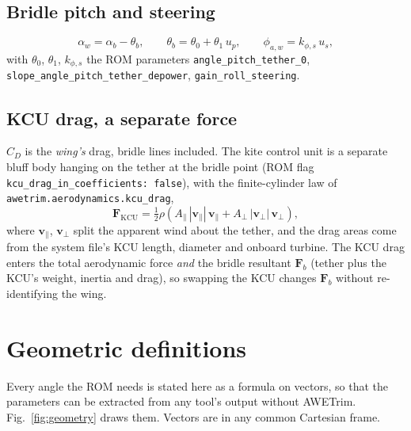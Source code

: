 \documentclass[11pt,a4paper]{article}
\newcommand{\code}[1]{\texttt{\small #1}}
\begin{document}
\subsection{Bridle pitch and steering}
\begin{equation}
  \alpha_w=\alpha_b-\theta_b,\qquad
  \theta_b=\theta_0+\theta_1\,u_p,\qquad
  \phi_{a,w}=k_{\phi,s}\,u_s ,
\end{equation}
with $\theta_0$, $\theta_1$, $k_{\phi,s}$ the ROM parameters
\code{angle\_pitch\_tether\_0}, \code{slope\_angle\_pitch\_tether\_depower},
\code{gain\_roll\_steering}.

\subsection{KCU drag, a separate force}
$C_D$ is the \emph{wing's} drag, bridle lines included. The kite control unit
is a separate bluff body hanging on the tether at the bridle point (ROM flag
\code{kcu\_drag\_in\_coefficients: false}), with the finite-cylinder law of
\code{awetrim.aerodynamics.kcu\_drag},
\begin{equation}
  \mathbf F_\mathrm{KCU}=\tfrac12\rho\left(A_\parallel\,|\mathbf v_\parallel|\,\mathbf v_\parallel
  + A_\perp\,|\mathbf v_\perp|\,\mathbf v_\perp\right),
\end{equation}
where $\mathbf v_\parallel$, $\mathbf v_\perp$ split the apparent wind about the
tether, and the drag areas come from the system file's KCU length, diameter and
onboard turbine. The KCU drag enters the total aerodynamic force \emph{and} the
bridle resultant $\mathbf F_b$ (tether plus the KCU's weight, inertia and drag),
so swapping the KCU changes $\mathbf F_b$ without re-identifying the wing.

\section{Geometric definitions}
\label{sec:geometry}
Every angle the ROM needs is stated here as a formula on vectors, so that the
parameters can be extracted from any tool's output without AWETrim.
Fig.~\ref{fig:geometry} draws them. Vectors are in any common Cartesian frame.
\end{document}
